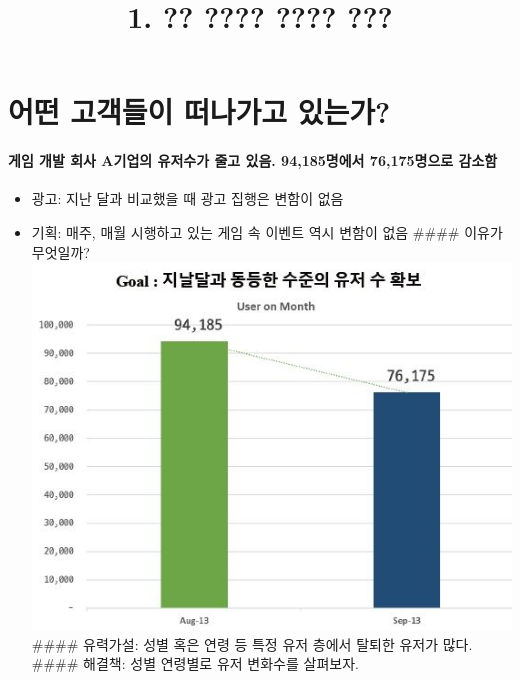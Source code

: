 \documentclass[11pt]{article}
\title{1. ?? ???? ???? ???}
\makeatletter
\def\maxwidth{\ifdim\Gin@nat@width>\linewidth\linewidth
    \else\Gin@nat@width\fi}
\let\Oldincludegraphics\includegraphics
\renewcommand{\includegraphics}[1]{\Oldincludegraphics[width=.8\maxwidth]{#1}}
\providecommand{\tightlist}{%
      \setlength{\itemsep}{0pt}\setlength{\parskip}{0pt}}
\makeatother
\begin{document}
    
    
    \maketitle
    
    

    
    \hypertarget{uxc5b4uxb5a4-uxace0uxac1duxb4e4uxc774-uxb5a0uxb098uxac00uxace0-uxc788uxb294uxac00}{%
\section{어떤 고객들이 떠나가고
있는가?}\label{uxc5b4uxb5a4-uxace0uxac1duxb4e4uxc774-uxb5a0uxb098uxac00uxace0-uxc788uxb294uxac00}}

\hypertarget{uxac8cuxc784-uxac1cuxbc1c-uxd68cuxc0ac-auxae30uxc5c5uxc758-uxc720uxc800uxc218uxac00-uxc904uxace0-uxc788uxc74c.-94185uxba85uxc5d0uxc11c-76175uxba85uxc73cuxb85c-uxac10uxc18cuxd568}{%
\paragraph{게임 개발 회사 A기업의 유저수가 줄고 있음. 94,185명에서
76,175명으로
감소함}\label{uxac8cuxc784-uxac1cuxbc1c-uxd68cuxc0ac-auxae30uxc5c5uxc758-uxc720uxc800uxc218uxac00-uxc904uxace0-uxc788uxc74c.-94185uxba85uxc5d0uxc11c-76175uxba85uxc73cuxb85c-uxac10uxc18cuxd568}}

\begin{itemize}
\tightlist
\item
  광고: 지난 달과 비교했을 때 광고 집행은 변함이 없음
\item
  기획: 매주, 매월 시행하고 있는 게임 속 이벤트 역시 변함이 없음
  \#\#\#\# 이유가 무엇일까? \includegraphics{1-1.jpg} \#\#\#\# 유력가설:
  성별 혹은 연령 등 특정 유저 층에서 탈퇴한 유저가 많다. \#\#\#\#
  해결책: 성별 연령별로 유저 변화수를 살펴보자.
\end{itemize}
\end{document}
